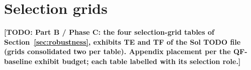 \documentclass{rQUF2e}
\theoremstyle{plain}
\theoremstyle{remark}
\newcommand{\TODO}[1]{\textbf{[TODO: #1]}}
\begin{document}
\section{Selection grids}
\label{app:robustness}

\TODO{Part B / Phase C: the four selection-grid tables of
Section~\ref{sec:robustness}, exhibits TE and TF of the Sol TODO file (grids
consolidated two per table). Appendix placement per the QF-baseline exhibit
budget; each table labelled with its selection role.}
\end{document}
